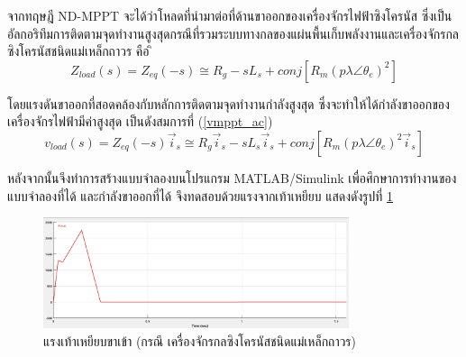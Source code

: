 \documentclass[11pt,a4paper]{article}
\begin{document}
จากทฤษฎี ND-MPPT จะได้ว่าโหลดที่นำมาต่อที่ด้านขาออกของเครื่องจักรไฟฟ้าซิงโครนัส ซึ่งเป็นอัลกอริทึมการติดตามจุดทำงานสูงสุดกรณีที่รวมระบบทางกลของแผ่นพื้นเก็บพลังงานและเครื่องจักรกลซิงโครนัสชนิดแม่เหล็กถาวร คือ
ิ\begin{equation} \label{zmppt_ac}
    Z_{load}(s)= Z_{eq} (-s) \cong R_{g} - sL_{s} + conj[R_{m}(p\lambda \angle \theta_{e})^2]
\end{equation}

โดยแรงดันขาออกที่สอดคล้องกับหลักการติดตามจุดทำงานกำลังสูงสุด ซึ่งจะทำให้ได้กำลังขาออกของเครื่องจักรไฟฟ้ามีค่าสูงสุด เป็นดังสมการที่ (\ref{vmppt_ac})
\begin{equation}\label{vmppt_ac}
    v_{load}(s) = Z_{eq} (-s)\vec{i}_{s} \cong R_{g}\vec{i}_{s} - sL_{s}\vec{i}_{s} + conj[R_{m}(p\lambda \angle \theta_{e})^2 \vec{i}_{s}]
\end{equation}

หลังจากนั้นจึงทำการสร้างแบบจำลองบนโปรแกรม MATLAB/Simulink เพื่อศึกษาการทำงานของแบบจำลองที่ได้ และกำลังขาออกที่ได้ จึงทดสอบด้วยแรงจากเท้าเหยียบ แสดงดังรูปที่ \ref{force_sim}
\begin{figure}[H]
    \begin{center}
        \includegraphics[width=0.8\textwidth]{force_sim.png}
    \end{center}
    \caption{แรงเท้าเหยียบขาเข้า (กรณี เครื่องจักรกลซิงโครนัสชนิดแม่เหล็กถาวร)}
    \label{force_sim}
\end{figure}
\end{document}
